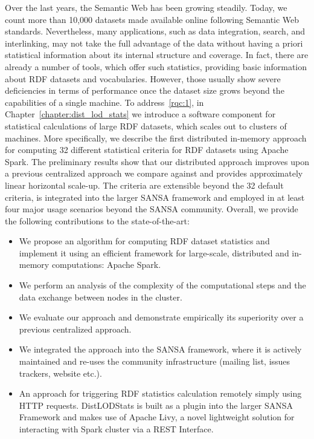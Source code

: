 Over the last years, the Semantic Web has been growing steadily. 
Today, we count more than 10,000 datasets made available online following Semantic Web standards.
Nevertheless, many applications, such as data integration, search, and interlinking, may not take the full advantage of the data without having a priori statistical information about its internal structure and coverage.
In fact, there are already a number of tools, which offer such statistics, providing basic information about \gls{RDF} datasets and vocabularies.
However, those usually show severe deficiencies in terms of performance once the dataset size grows beyond the capabilities of a single machine.
To address~\ref{rqc:1}, in Chapter~\ref{chapter:dist_lod_stats} we introduce a software component for statistical calculations of large \gls{RDF} datasets, which scales out to clusters of machines.
More specifically, we describe the first distributed in-memory approach for computing 32 different statistical criteria for \gls{RDF} datasets using Apache Spark.
The preliminary results show that our distributed approach improves upon a previous centralized approach we compare against and provides approximately linear horizontal scale-up. 
The criteria are extensible beyond the 32 default criteria, is integrated into the larger SANSA framework and employed in at least four major usage scenarios beyond the SANSA community.
Overall, we provide the following contributions to the state-of-the-art:

\begin{itemize}
    \item We propose an algorithm for computing \gls{RDF} dataset statistics and implement it using an efficient framework for large-scale, distributed and in-memory computations: Apache Spark.
    \item We perform an analysis of the complexity of the computational steps and the data exchange between nodes in the cluster. 
    \item We evaluate our approach and demonstrate empirically its superiority over a previous centralized approach.
    \item We integrated the approach into the SANSA framework, where it is actively maintained and re-uses the community infrastructure (mailing list, issues trackers, website etc.).
    \item An approach for triggering \gls{RDF} statistics calculation remotely simply using HTTP requests. 
    DistLODStats is built as a plugin into the larger SANSA Framework and makes use of Apache Livy, a novel lightweight solution for interacting with Spark cluster via a REST Interface.
\end{itemize}


